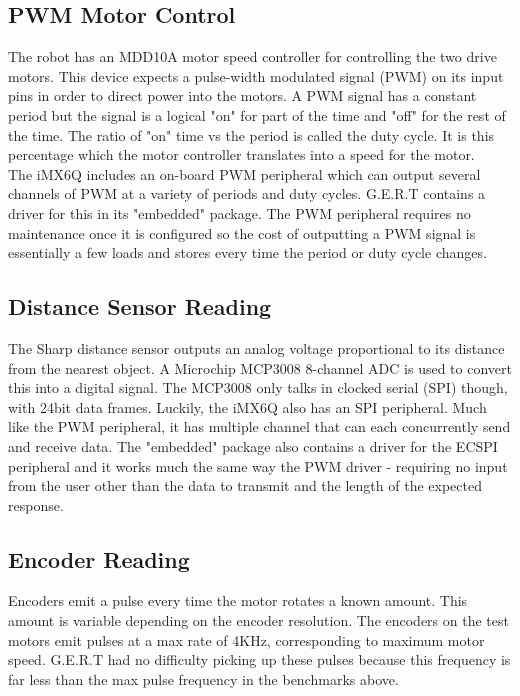 \subsection{PWM Motor Control}
The robot has an MDD10A motor speed controller for controlling the two drive motors. This device
expects a pulse-width modulated signal (PWM) on its input pins in order to direct power into the
motors. A PWM signal has a constant period but the signal is a logical "on" for part of the time
and "off" for the rest of the time. The ratio of "on" time vs the period is called the duty cycle.
It is this percentage which the motor controller translates into a speed for the motor.\\

The iMX6Q includes an on-board PWM peripheral which can output several channels of PWM
at a variety of periods and duty cycles. G.E.R.T contains a driver for this in its "embedded"
package. The PWM peripheral requires no maintenance once it is configured so the cost of outputting
a PWM signal is essentially a few loads and stores every time the period or duty cycle changes.

\subsection{Distance Sensor Reading}
The Sharp distance sensor outputs an analog voltage proportional to its distance from the nearest object.
A Microchip MCP3008 8-channel ADC is used to convert this into a digital signal. The MCP3008 only talks in clocked
serial (SPI) though, with 24bit data frames. Luckily, the iMX6Q also has an SPI peripheral. Much like the
PWM peripheral, it has multiple channel that can each concurrently send and receive data. The "embedded"
package also contains a driver for the ECSPI peripheral and it works much the same way the PWM driver - 
requiring no input from the user other than the data to transmit and the length of the expected response.

\subsection{Encoder Reading}
Encoders emit a pulse every time the motor rotates a known amount. This amount is variable depending on the
encoder resolution. The encoders on the test motors emit pulses at a max rate of 4KHz, corresponding to
maximum motor speed. G.E.R.T had no difficulty picking up these pulses because this frequency is far less than
the max pulse frequency in the benchmarks above.

